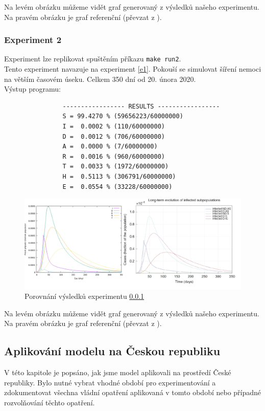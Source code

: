\documentclass[a4paper,11pt]{article}
\begin{document}
			Na levém obrázku můžeme vidět graf generovaný z výsledků našeho experimentu. Na pravém obrázku je graf referenční (převzat z \cite{source}). 
			
		\subsubsection{Experiment 2}
		\label{e2}
			Experiment lze replikovat spuštěním příkazu \texttt{make run2}.\\
			
			Tento experiment navazuje na experiment \ref{e1}. Pokouší se simulovat šíření nemoci na větším časovém úseku. Celkem 350 dní od 20. února 2020.\\
			
			\noindent Výstup programu:
			\begin{verbatim}
				----------------- RESULTS -----------------
				S = 99.4270 % (59656223/60000000)
				I =  0.0002 % (110/60000000)
				D =  0.0012 % (706/60000000)
				A =  0.0000 % (7/60000000)
				R =  0.0016 % (960/60000000)
				T =  0.0033 % (1972/60000000)
				H =  0.5113 % (306791/60000000)
				E =  0.0554 % (33228/60000000)
			\end{verbatim}
		
			\begin{figure}[H]
				\caption{Porovnání výsledků experimentu \ref{e2}}
				\label{fig3}
				\centering
				\includegraphics[scale=0.6]{comparison2.png}
			\end{figure}
		
			Na levém obrázku můžeme vidět graf generovaný z výsledků našeho experimentu. Na pravém obrázku je graf referenční (převzat z \cite{source}). 
		
	\subsection{Aplikování modelu na Českou republiku}
	\label{cz}
		V této kapitole je popsáno, jak jsme model aplikovali na prostředí České republiky. Bylo nutné vybrat vhodné období pro experimentování a zdokumentovat všechna vládní opatření aplikovaná v tomto období nebo případné rozvolňování těchto opatření.
		
\end{document}
